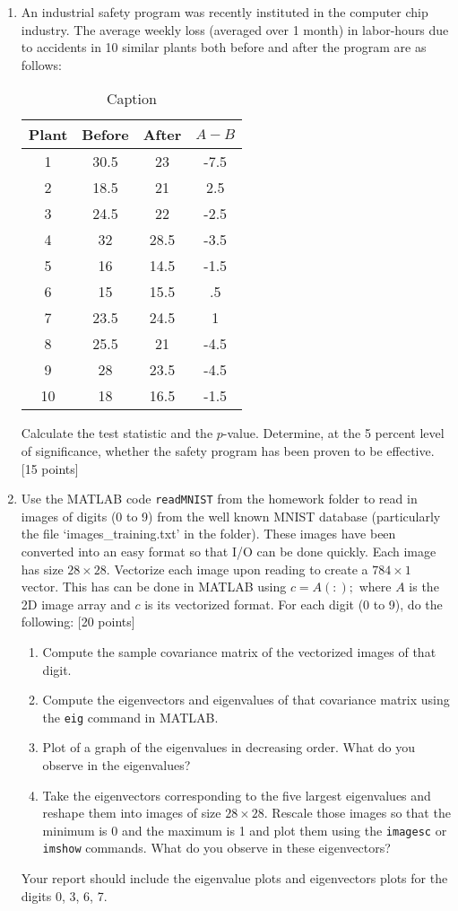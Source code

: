 \documentclass[11pt]{article}
\begin{document}
\begin{enumerate}
\item An industrial safety program was recently instituted in the computer chip industry. The average weekly loss (averaged over 1 month) in labor-hours due to accidents in 10 similar plants both before and after the program are as follows:
\begin{table}[]
    \centering
    \begin{tabular}{|c|c|c|c|}
    \hline
Plant & Before & After & $A-B$ \\
\hline
1 & 30.5 & 23 & -7.5 \\
2 & 18.5 & 21 & 2.5 \\
3 & 24.5 & 22 & -2.5 \\
4 &32 &28.5 & -3.5 \\
5 &16 &14.5 & -1.5 \\
6 &15 &15.5 &.5 \\
7 &23.5 &24.5 &1 \\
8 &25.5 &21 & -4.5 \\
9 &28 &23.5 & -4.5 \\
10 & 18 &16.5 & -1.5\\\hline
    \end{tabular}
    \caption{Caption}
    \label{tab:placeholder}
\end{table}
Calculate the test statistic and the $p$-value. Determine, at the 5 percent level of significance, whether the safety program has been proven to be effective. \textsf{[15 points]}

\item Use the MATLAB code \texttt{readMNIST} from the homework folder to read in images of digits (0 to 9) from the well known MNIST database (particularly the file `images\_training.txt' in the folder). These images have been converted into an easy format so that I/O can be done quickly. Each image has size $28 \times 28$. Vectorize each image upon reading to create a $784 \times 1$ vector. This has can be done in MATLAB using $c = A(:);$ where $A$ is the 2D image array and $c$ is its vectorized format. For each digit (0 to 9), do the following: \textsf{[20 points]}
\begin{enumerate}
    \item Compute the sample covariance matrix of the vectorized images of that digit.
    \item Compute the eigenvectors and eigenvalues of that covariance matrix using the \texttt{eig} command in MATLAB.
    \item Plot of a graph of the eigenvalues in decreasing order. What do you observe in the eigenvalues?
    \item Take the eigenvectors corresponding to the five largest eigenvalues and reshape them into images of size $28 \times 28$. Rescale those images so that the minimum is 0 and the maximum is 1 and plot them using the \texttt{imagesc} or \texttt{imshow} commands. What do you observe in these eigenvectors?  
\end{enumerate}
Your report should include the eigenvalue plots and eigenvectors plots for the digits 0, 3, 6, 7. 
\end{enumerate}
\end{document}
